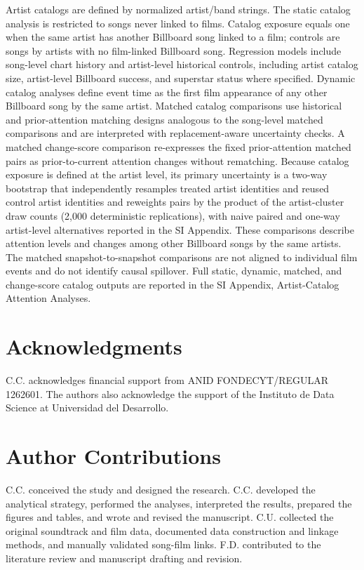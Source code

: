 \documentclass[10pt]{article}
\begin{document}
Artist catalogs are defined by normalized artist/band strings. The static catalog analysis is restricted to songs never linked to films. Catalog exposure equals one when the same artist has another Billboard song linked to a film; controls are songs by artists with no film-linked Billboard song. Regression models include song-level chart history and artist-level historical controls, including artist catalog size, artist-level Billboard success, and superstar status where specified. Dynamic catalog analyses define event time as the first film appearance of any other Billboard song by the same artist. Matched catalog comparisons use historical and prior-attention matching designs analogous to the song-level matched comparisons and are interpreted with replacement-aware uncertainty checks. A matched change-score comparison re-expresses the fixed prior-attention matched pairs as prior-to-current attention changes without rematching. Because catalog exposure is defined at the artist level, its primary uncertainty is a two-way bootstrap that independently resamples treated artist identities and reused control artist identities and reweights pairs by the product of the artist-cluster draw counts (2,000 deterministic replications), with naive paired and one-way artist-level alternatives reported in the SI Appendix. These comparisons describe attention levels and changes among other Billboard songs by the same artists. The matched snapshot-to-snapshot comparisons are not aligned to individual film events and do not identify causal spillover. Full static, dynamic, matched, and change-score catalog outputs are reported in the SI Appendix, Artist-Catalog Attention Analyses.


\section*{Acknowledgments}

C.C. acknowledges financial support from ANID FONDECYT/REGULAR 1262601. The authors also acknowledge the support of the Instituto de Data Science at Universidad del Desarrollo.


\section*{Author Contributions}

C.C. conceived the study and designed the research. C.C. developed the analytical strategy, performed the analyses, interpreted the results, prepared the figures and tables, and wrote and revised the manuscript. C.U. collected the original soundtrack and film data, documented data construction and linkage methods, and manually validated song-film links. F.D. contributed to the literature review and manuscript drafting and revision.
\end{document}
